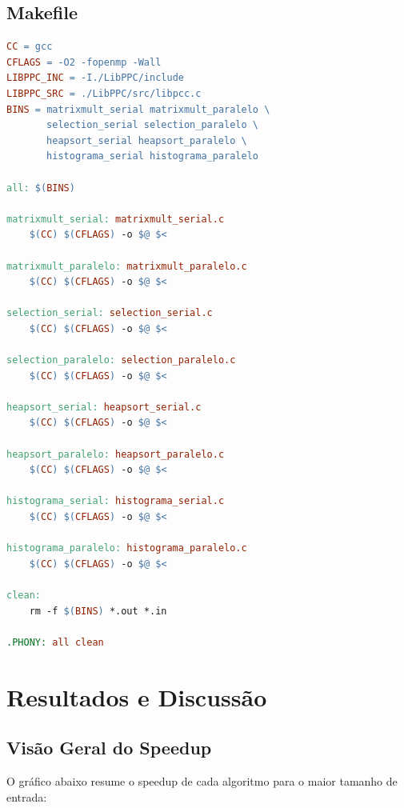 \documentclass[12pt]{article}
\begin{document}
\subsection{Makefile}

\begin{lstlisting}[language=make, caption={Makefile}]
CC = gcc
CFLAGS = -O2 -fopenmp -Wall
LIBPPC_INC = -I./LibPPC/include
LIBPPC_SRC = ./LibPPC/src/libpcc.c
BINS = matrixmult_serial matrixmult_paralelo \
       selection_serial selection_paralelo \
       heapsort_serial heapsort_paralelo \
       histograma_serial histograma_paralelo

all: $(BINS)

matrixmult_serial: matrixmult_serial.c
	$(CC) $(CFLAGS) -o $@ $<

matrixmult_paralelo: matrixmult_paralelo.c
	$(CC) $(CFLAGS) -o $@ $<

selection_serial: selection_serial.c
	$(CC) $(CFLAGS) -o $@ $<

selection_paralelo: selection_paralelo.c
	$(CC) $(CFLAGS) -o $@ $<

heapsort_serial: heapsort_serial.c
	$(CC) $(CFLAGS) -o $@ $<

heapsort_paralelo: heapsort_paralelo.c
	$(CC) $(CFLAGS) -o $@ $<

histograma_serial: histograma_serial.c
	$(CC) $(CFLAGS) -o $@ $<

histograma_paralelo: histograma_paralelo.c
	$(CC) $(CFLAGS) -o $@ $<

clean:
	rm -f $(BINS) *.out *.in

.PHONY: all clean
\end{lstlisting}

\section{Resultados e Discussão}

\subsection{Visão Geral do Speedup}

O gráfico abaixo resume o speedup de cada algoritmo para o maior tamanho de entrada:
\end{document}
